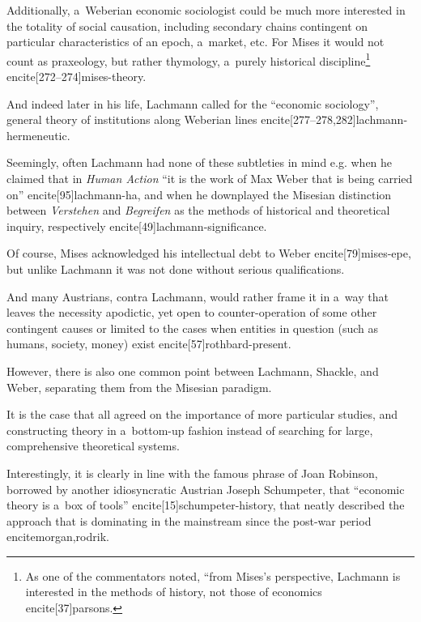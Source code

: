 {Additionally, a~Weberian economic sociologist could be much more interested in the totality of social causation, including secondary chains contingent on particular characteristics of an epoch, a~market, etc. For Mises it would not count as praxeology, but rather thymology, a~purely historical discipline\footnote{As one of the commentators noted, ``from Mises's perspective, Lachmann is interested in the methods of history, not those of economics encite[37]{parsons}.} encite[272--274]{mises-theory}.

And indeed later in his life, Lachmann called for the ``economic sociology'', general theory of institutions along Weberian lines encite[277--278,282]{lachmann-hermeneutic}.



Seemingly, often Lachmann had none of these subtleties in mind e.g. when he claimed that in \emph{Human Action} ``it is the work of Max Weber that is being carried on'' encite[95]{lachmann-ha}, and when he downplayed the Misesian distinction between \emph{Verstehen} and \emph{Begreifen} as the methods of historical and theoretical inquiry, respectively encite[49]{lachmann-significance}.

Of course, Mises acknowledged his intellectual debt to Weber encite[79]{mises-epe}, but unlike Lachmann it was not done without serious qualifications.

And many Austrians, contra Lachmann, would rather frame it in a~way that leaves the necessity apodictic, yet open to counter-operation of some other contingent causes or limited to the cases when entities in question (such as humans, society, money) exist encite[57]{rothbard-present}.



However, there is also one common point between Lachmann, Shackle, and Weber, separating them from the Misesian paradigm.

It is the case that all agreed on the importance of more particular studies, and constructing theory in a~bottom-up fashion instead of searching for large, comprehensive theoretical systems.

Interestingly, it is clearly in line with the famous phrase of Joan Robinson, borrowed by another idiosyncratic Austrian Joseph Schumpeter, that ``economic theory is a~box of tools'' encite[15]{schumpeter-history}, that neatly described the approach that is dominating in the mainstream since the post-war period encite{morgan,rodrik}.



}
